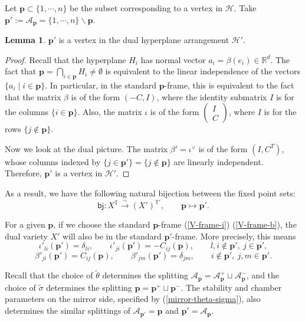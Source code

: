 \documentclass[10pt]{amsart}
\theoremstyle{definition}
\def\RR{{\mathbb{R}}}
\def\TT{\mathbb{T}}
\newcommand{\bp}{\mathbf{p}}
\newcommand{\cA}{\mathcal{A}}
\newcommand{\cH}{\mathcal{H}}
\theoremstyle{definition}
\numberwithin{equation}{section}
\theoremstyle{Theorem}
\newtheorem{Lemma}[Definition]{Lemma}
\begin{document}
Let $\bp \subset \{1, \cdots, n\}$ be the subset corresponding to a vertex in $\cH$. Take $\bp' := \cA_\bp =  \{ 1, \cdots, n \} \backslash \bp$.

\begin{Lemma}
$\bp'$ is a vertex in the dual hyperplane arrangement $\cH'$.
\end{Lemma}

\begin{proof}
Recall that the hyperplane $H_i$ has normal vector $a_i = \beta (e_i) \in \RR^d$. The fact that $\bp = \bigcap_{i\in \bp} H_i \neq \emptyset$ is equivalent to the linear independence of the vectors $\{ a_i \mid i\in \bp \}$. In particular, in the standard $\bp$-frame, this is equivalent to the fact that the matrix $\beta$ is of the form $(-C, I)$, where the identity submatrix $I$ is for the columns $\{i \in \bp\}$. Also, the matrix $\iota$ is of the form $\begin{pmatrix}
I \\
C
\end{pmatrix}$, where $I$ is for the rows $\{ j \not\in \bp \}$.

Now we look at the dual picture. The matrix $\beta' = \iota^\vee$ is of the form $(I, C^T)$, whose columns indexed by $\{j \in \bp' \} = \{j\not\in \bp \}$ are linearly independent. Therefore, $\bp'$ is a vertex in $\cH'$.
\end{proof}

As a result, we have the following natural bijection between the fixed point sets:
\begin{equation} \label{bj-fixed}
\textsf{bj}: X^\TT \xrightarrow{\sim} (X')^{\TT'}, \qquad \bp \mapsto \bp'.
\end{equation}

For a given $\bp$, if we choose the standard $\bp$-frame (\ref{V-frame-i}) (\ref{V-frame-b}), the dual variety $X'$ will also be in the standard $\bp'$-frame. More precisely, this means
$$
\iota'_{li} (\bp') = \delta_{li}, \qquad \iota'_{ji} (\bp') = - C_{ij} (\bp), \qquad l, i \not\in \bp', \ j \in \bp',
$$
$$
\beta'_{ji} (\bp') = C_{ij} (\bp), \qquad \beta'_{jm} (\bp') = \delta_{jm}, \qquad i \not\in \bp', \ j, m \in \bp'.
$$

Recall that the choice of $\widetilde\theta$ determines the splitting $\cA_\bp = \cA_\bp^+ \sqcup \cA_\bp^-$, and the choice of $\widetilde\sigma$ determines the splitting $\bp = \bp^+ \sqcup \bp^-$. The stability and chamber parameters on the mirror side, specified by (\ref{mirror-theta-sigma}), also determines the similar splittings of $\cA_{\bp'} = \bp$ and $\bp' = \cA_\bp$.
\end{document}
